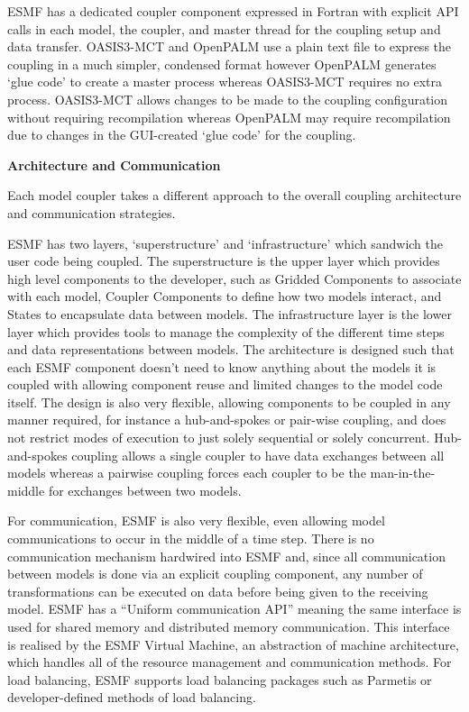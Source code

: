 ESMF has a dedicated coupler component expressed in Fortran with explicit API
calls in each model, the coupler, and master thread for the coupling setup and
data transfer. OASIS3-MCT and OpenPALM use a plain text file to express the
coupling in a much simpler, condensed format however OpenPALM generates `glue
code' to create a master process whereas OASIS3-MCT requires no extra process.
OASIS3-MCT allows changes to be made to the coupling configuration without
requiring recompilation whereas OpenPALM may require recompilation due to
changes in the GUI-created `glue code' for the coupling.

\textbf{Architecture and Communication}

Each model coupler takes a different approach to the overall coupling
architecture and communication strategies.

ESMF has two layers, `superstructure' and `infrastructure' which sandwich the
user code being coupled. The superstructure is the upper layer which provides
high level components to the developer, such as Gridded Components to associate
with each model, Coupler Components to define how two models interact, and
States to encapsulate data between models. The infrastructure layer is the lower
layer which provides tools to manage the complexity of the different time steps
and data representations between models. The architecture is designed such that
each ESMF component doesn't need to know anything about the models it is coupled
with allowing component reuse and limited changes to the model code itself. The
design is also very flexible, allowing components to be coupled in any manner
required, for instance a hub-and-spokes or pair-wise coupling, and does not
restrict modes of execution to just solely sequential or solely concurrent.
Hub-and-spokes coupling allows a single coupler to have data exchanges between
all models whereas a pairwise coupling forces each coupler to be the
man-in-the-middle for exchanges between two models.

For communication, ESMF is also very flexible, even allowing model
communications to occur in the middle of a time step. There is no communication
mechanism hardwired into ESMF and, since all communication between models is
done via an explicit coupling component, any number of transformations can be
executed on data before being given to the receiving model. ESMF has a ``Uniform
communication API'' \cite{ESMF2014} meaning the same interface is used for
shared memory and distributed memory communication. This interface is realised
by the ESMF Virtual Machine, an abstraction of machine architecture, which
handles all of the resource management and communication methods. For load
balancing, ESMF supports load balancing packages such as Parmetis
\cite{Hoefler2010,Karypis1998} or developer-defined methods of load balancing.

